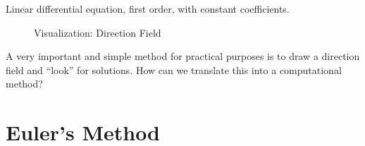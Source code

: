 \documentclass[a4paper,12pt]{report}
\begin{document}
	Linear differential equation, first order, with constant coefficients.
	
	
	\begin{figure}[!htb]

	\caption{Visualization: Direction Field}\label{fig:Tangent Field}
	\end{figure}
	\FloatBarrier
	
	
	A very important and simple method for practical purposes is to draw a direction field and ``look'' for solutions.
	How can we translate	this into a computational method?

	\section{Euler's Method}
\end{document}
